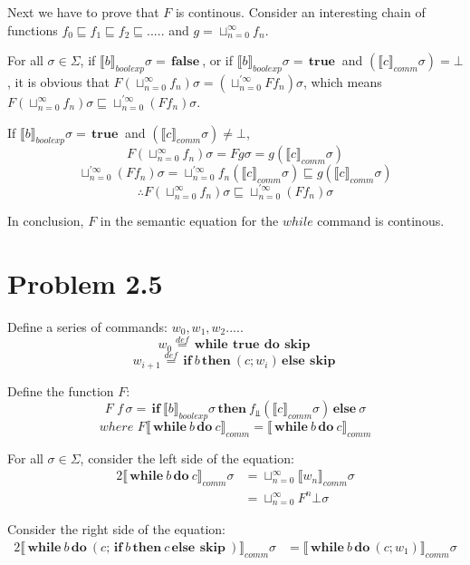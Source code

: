 \documentclass[a4papers]{ctexart}
\newcommand{\bif}{\,\boldsymbol{if}\ }
\newcommand{\belse}{\,\boldsymbol{else}\ }
\newcommand{\bthen}{\,\boldsymbol{then}\ }
\newcommand{\bskip}{\,\boldsymbol{skip}\  }
\newcommand{\bwhile}{\,\boldsymbol{while}\ }
\newcommand{\bdo}{\,\boldsymbol{do}\ }
\newcommand{\btrue}{\,\boldsymbol{true}\ }
\newcommand{\bfalse}{\,\boldsymbol{false}\ }
\newcommand{\commBlock}[1]{\llbracket {#1} \rrbracket_{comm}}
\newcommand{\boolBlock}[1]{\llbracket {#1} \rrbracket_{boolexp}}
\begin{document}
Next we have to prove that $F$ is continous. Consider an interesting chain of functions $f_0 \sqsubseteq f_1 \sqsubseteq f_2 \sqsubseteq .....$
and $g = \sqcup_{n=0}^{\infty}f_n$.

For all $\sigma \in \Sigma$, 
if $\boolBlock{b}\sigma = \bfalse$, or if $\boolBlock{b}\sigma = \btrue$ and $(\commBlock{c}\sigma) = \bot$,
it is obvious that $F (\sqcup_{n=0}^{\infty}f_n) \sigma = (\sqcup_{n=0}^{'\infty}F f_n) \sigma$,
 which means $F (\sqcup_{n=0}^{\infty}f_n) \sigma \sqsubseteq \sqcup_{n=0}^{'\infty}(F f_n) \sigma$.

 If $\boolBlock{b}\sigma = \btrue$ and $(\commBlock{c}\sigma) \ne \bot$,
 \[F (\sqcup_{n=0}^{\infty}f_n) \sigma =F g \sigma= g (\commBlock{c}\sigma)\]
 \[\sqcup_{n=0}^{'\infty}(F f_n) \sigma=\sqcup_{n=0}^{'\infty}f_n(\commBlock{c}\sigma)\sqsubseteq g (\commBlock{c}\sigma)\]
\[\therefore F (\sqcup_{n=0}^{\infty}f_n) \sigma \sqsubseteq \sqcup_{n=0}^{'\infty}(F f_n)\sigma\]

In conclusion, $F$ in the semantic equation for the $while$ command is continous.

\section{Problem 2.5}
 Define a series of commands: $w_0,w_1,w_2.....$
\[ w_0 \overset{def}= \bwhile \btrue \bdo \bskip\]
\[ w_{i+1} \overset{def}= \bif b \bthen (c;w_i) \belse \bskip\]

Define the function $F$:
\[ F \,\, f\,\sigma = \bif \boolBlock{b}\sigma \bthen f_{\Perp}(\commBlock{c}\sigma)  \belse \sigma \]
\[ where \,\, F \commBlock{\bwhile b \bdo c} =\commBlock{\bwhile b \bdo c}\]

For all $\sigma \in \Sigma$, consider the left side of the equation:
\begin{alignat*}{2}
    \commBlock{\bwhile b \bdo c}\sigma 
    &= \sqcup_{n=0}^{\infty}\commBlock{w_n}\sigma\\
    &= \sqcup_{n=0}^{\infty}F^n\bot\sigma
\end{alignat*}

Consider the right side of the equation:
\begin{alignat*}{2}
    \commBlock{\bwhile b \bdo (c;\bif b \bthen c \belse \bskip)}\sigma 
    &= \commBlock{\bwhile b \bdo (c;w_1)}\sigma 
\end{alignat*}
\end{document}
